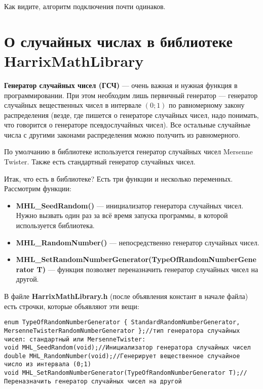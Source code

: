 \documentclass[a4paper,12pt]{article}
\begin{document}
Как видите, алгоритм подключения почти одинаков.

\newpage
\section{О случайных числах в библиотеке HarrixMathLibrary}\label{section_random}

\textbf{Генератор случайных чисел (ГСЧ)} --- очень важная и нужная функция в программировании. При этом необходим лишь первичный генератор --- генератор случайных вещественных чисел в интервале $\left( 0; 1\right)$ по равномерному закону распределения (везде, где пишется о генераторе случайных чисел, надо понимать, что говорится о генераторе псевдослучайных чисел). Все остальные случайные числа с другими законами распределения можно получить из равномерного.

По умолчанию в библиотеке используется генератор случайных чисел Mersenne Twister. Также есть стандартный генератор случайных чисел.


Итак, что есть в библиотеке? Есть три функции и несколько переменных. Рассмотрим функции:
\begin{itemize}
\item \textbf{MHL\_SeedRandom()} --- инициализатор генератора случайных чисел. Нужно вызвать один раз за всё время запуска программы, в которой используется библиотека.
\item \textbf{MHL\_RandomNumber()} --- непосредственно генератор случайных чисел.
\item \textbf{MHL\_SetRandomNumberGenerator(TypeOfRandomNumberGenerator T)} --- функция позволяет переназначить генератор случайных чисел на другой.
\end{itemize}

В файле \textbf{HarrixMathLibrary.h} (после объявления констант в начале файла) есть строчки, которые объявляют эти вещи:
\begin{lstlisting}[label=random_h,caption=Объявление функций в HarrixMathLibrary.h]
enum TypeOfRandomNumberGenerator { StandardRandomNumberGenerator, MersenneTwisterRandomNumberGenerator };//тип генератора случайных чисел: стандартный или MersenneTwister:
void MHL_SeedRandom(void);//Инициализатор генератора случайных чисел
double MHL_RandomNumber(void);//Генерирует вещественное случайное число из интервала (0;1)
void MHL_SetRandomNumberGenerator(TypeOfRandomNumberGenerator T);//Переназначить генератор случайных чисел на другой
\end{lstlisting}
\end{document}
